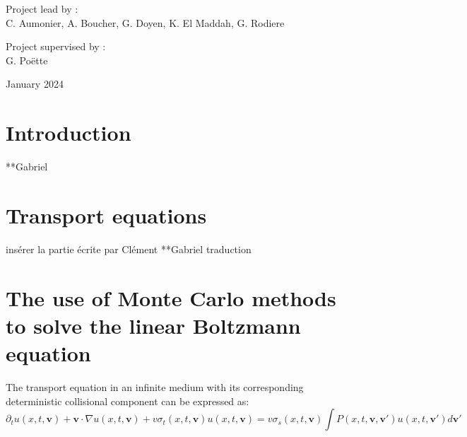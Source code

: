 \documentclass[a4paper, 11pt]{article}
\begin{document}
\begin{titlepage}
		\bigskip
		\bigskip
		
		\centering
		\Large{Project lead by :} \\
		\Large{C. Aumonier, A. Boucher, G. Doyen, K. El Maddah, G. Rodiere}
		
		
		\vfill\vfill\vfill %
		{\Large  Project supervised by :}\\
		\Large{G. Poëtte}
		
		\vspace{0,5cm}
		
		{\large January 2024} %
		
		
		
		
		\vfill %
		
	\end{titlepage}
	
\tableofcontents

\newpage
	
\section{Introduction}

**Gabriel

\section{Transport equations}

insérer la partie écrite par Clément
**Gabriel traduction

\section{The use of Monte Carlo methods to solve the linear Boltzmann equation}

The transport equation in an infinite medium with its corresponding deterministic collisional component can be expressed as:
\begin{equation}
	\partial _t u(x,t,\textbf{v}) + \textbf{v} \cdot \nabla u(x,t,\textbf{v}) + v\sigma_t (x,t,\textbf{v})u(x,t,\textbf{v})= v\sigma_s(x,t,\textbf{v})\int P (x,t,\textbf{v},\textbf{v}')u(x,t,\textbf{v}')d\textbf{v}' \label{ref11}
\end{equation}
\end{document}
